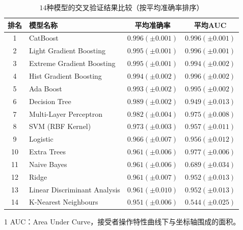 \begin{table}[htbp]
    \centering
    \scriptsize
    \begin{threeparttable}
        \begin{tabular}{clcc}
            \toprule
            排名 & 模型名称                         & 平均准确率               & 平均AUC\tnote{1}      \\
            \midrule
            1  & CatBoost                     & $0.996 (\pm 0.001)$ & $0.996 (\pm 0.001)$ \\
            2  & Light Gradient Boosting      & $0.995 (\pm 0.001)$ & $0.996 (\pm 0.001)$ \\
            3  & Extreme Gradient Boosting    & $0.995 (\pm 0.001)$ & $0.994 (\pm 0.002)$ \\
            4  & Hist Gradient Boosting       & $0.994 (\pm 0.002)$ & $0.996 (\pm 0.002)$ \\
            5  & Ada Boost                    & $0.993 (\pm 0.002)$ & $0.995 (\pm 0.002)$ \\
            6  & Decision Tree                & $0.989 (\pm 0.002)$ & $0.949 (\pm 0.013)$ \\
            7  & Multi-Layer Perceptron       & $0.982 (\pm 0.004)$ & $0.975 (\pm 0.008)$ \\
            8  & SVM (RBF Kernel)             & $0.973 (\pm 0.003)$ & $0.957 (\pm 0.011)$ \\
            9  & Logistic                     & $0.966 (\pm 0.007)$ & $0.956 (\pm 0.012)$ \\
            10 & Extra Trees                  & $0.961 (\pm 0.006)$ & $0.977 (\pm 0.006)$ \\
            11 & Naive Bayes                  & $0.961 (\pm 0.006)$ & $0.689 (\pm 0.034)$ \\
            12 & Ridge                        & $0.961 (\pm 0.007)$ & $0.952 (\pm 0.013)$ \\
            13 & Linear Discriminant Analysis & $0.961 (\pm 0.010)$ & $0.952 (\pm 0.013)$ \\
            14 & K-Nearest Neighbours         & $0.951 (\pm 0.006)$ & $0.544 (\pm 0.025)$ \\
            \bottomrule
        \end{tabular}
        \begin{tablenotes}
            \tiny
            \item[1] AUC：Area Under Curve，接受者操作特性曲线下与坐标轴围成的面积。
        \end{tablenotes}
    \end{threeparttable}
    \caption{$14$种模型的交叉验证结果比较（按平均准确率排序）}
    \label{table:model-comparison}
\end{table}

